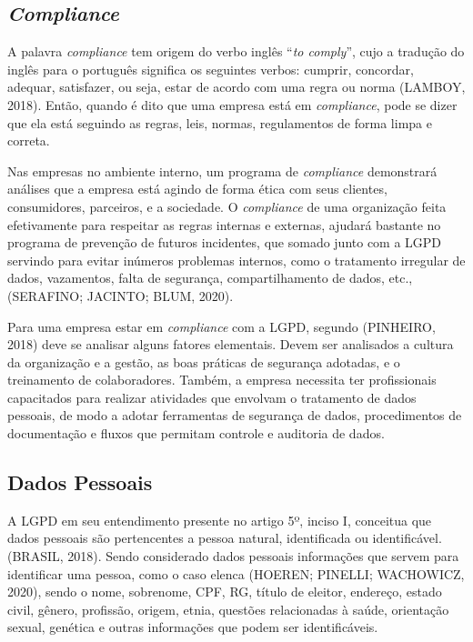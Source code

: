\documentclass[
	12pt,				%
	openright,			%
	oneside,			%
	a4paper,			%
	english,			%
	french,				%
	spanish,			%
	brazil,				%
	]{abntex2}
\begin{document}
\subsection{\textit{Compliance}}

A palavra \textit{compliance} tem origem do verbo inglês “\textit{to comply}”, cujo a tradução do inglês para o português significa os seguintes verbos: cumprir, concordar, adequar, satisfazer, ou seja, estar de acordo com uma regra ou norma (LAMBOY, 2018). Então, quando é dito que uma empresa está em \textit{compliance}, pode se dizer que ela está seguindo as regras, leis, normas, regulamentos de forma limpa e correta.

Nas empresas no ambiente interno, um programa de \textit{compliance} demonstrará análises que a empresa está agindo de forma ética com seus clientes, consumidores, parceiros, e a sociedade. O \textit{compliance} de uma organização feita efetivamente para respeitar as regras internas e externas, ajudará bastante no programa de prevenção de futuros incidentes, que somado junto com a LGPD servindo para evitar inúmeros problemas internos, como o tratamento irregular de dados, vazamentos, falta de segurança, compartilhamento de dados, etc., (SERAFINO; JACINTO; BLUM, 2020).

Para uma empresa estar em \textit{compliance} com a LGPD, segundo (PINHEIRO, 2018) deve se analisar alguns fatores elementais. Devem ser analisados a cultura da organização e a gestão, as boas práticas de segurança adotadas, e o treinamento de colaboradores. Também, a empresa necessita ter profissionais capacitados para realizar atividades que envolvam o tratamento de dados pessoais, de modo a adotar ferramentas de segurança de dados, procedimentos de documentação e fluxos que permitam controle e auditoria de dados. 

\subsection{Dados Pessoais}

A LGPD em seu entendimento presente no artigo 5º, inciso I, conceitua que dados pessoais são pertencentes a pessoa natural, identificada ou identificável. (BRASIL, 2018).  Sendo considerado dados pessoais informações que servem para identificar uma pessoa, como o caso elenca (HOEREN; PINELLI; WACHOWICZ, 2020), sendo o nome, sobrenome, CPF, RG, título de eleitor, endereço, estado civil, gênero, profissão, origem, etnia, questões relacionadas à saúde, orientação sexual, genética e outras informações que podem ser identificáveis.
\end{document}
